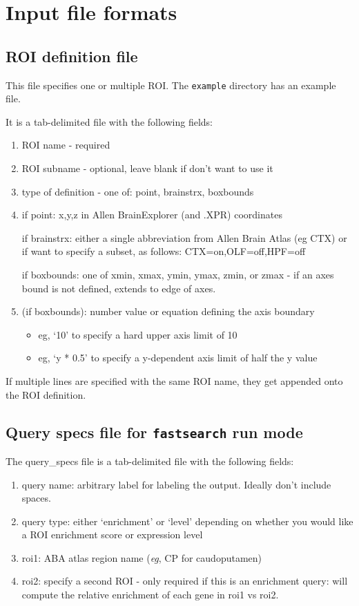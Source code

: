 \documentclass[10pt]{article}
\begin{document}
\section{Input file formats}
\subsection{ROI definition file}
This file specifies one or multiple ROI. The {\tt example} directory has an example file.

It is a tab-delimited file with the following fields:
\begin{enumerate}
\item ROI name - required
\item ROI subname - optional, leave blank if don't want to use it
\item type of definition - one of: point, brainstrx, boxbounds
\item if point: x,y,z in Allen BrainExplorer (and .XPR) coordinates

if brainstrx: either a single abbreviation from Allen Brain Atlas (eg CTX) or if want to specify a subset, as follows: CTX=on,OLF=off,HPF=off

if boxbounds: one of xmin, xmax, ymin, ymax, zmin, or zmax - if an axes bound is not defined, extends to edge of axes.

\item (if boxbounds): number value or equation defining the axis boundary
   \begin{itemize}
      \item eg, `10' to specify a hard upper axis limit of 10
      \item eg, `y * 0.5' to specify a y-dependent axis limit of half the y value
   \end{itemize}
\end{enumerate}

If multiple lines are specified with the same ROI name, they get appended onto the ROI definition.

\subsection{Query specs file for {\tt fastsearch} run mode}

The query\_specs file is a tab-delimited file with the following fields:
\begin{enumerate}
   \item query name: arbitrary label for labeling the output. Ideally don't include spaces.
   \item query type: either `enrichment' or `level' depending on whether you would like a ROI enrichment score or expression level
   \item roi1: ABA atlas region name ({\it eg}, CP for caudoputamen)
   \item roi2: specify a second ROI - only required if this is an enrichment query: will compute the relative enrichment of each gene in roi1 vs roi2.
\end{enumerate}
\end{document}
